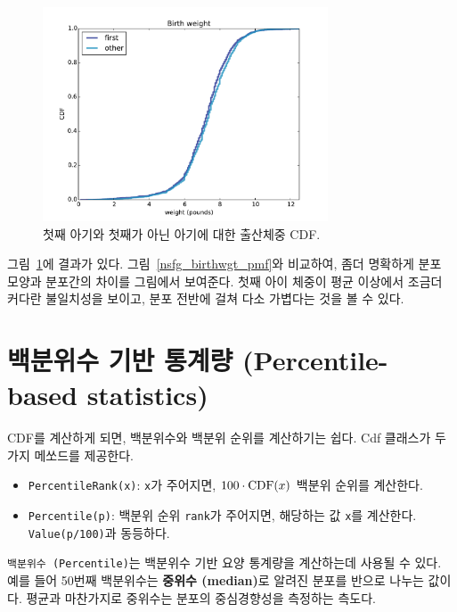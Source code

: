 \begin{figure}
\centerline{\includegraphics[height=2.5in]{figs/cumulative_birthwgt_cdf.pdf}}
\caption{첫째 아기와 첫째가 아닌 아기에 대한 출산체중 CDF.}
\label{cumulative_birthwgt_cdf}
\end{figure}

그림~\ref{cumulative_birthwgt_cdf}에 결과가 있다.
그림~\ref{nsfg_birthwgt_pmf}와 비교하여, 좀더 명확하게 분포 모양과 분포간의 차이를 그림에서 보여준다.
첫째 아이 체중이 평균 이상에서 조금더 커다란 불일치성을 보이고, 분포 전반에 걸쳐 다소 가볍다는 것을 볼 수 있다.


\section{백분위수 기반 통계량 (Percentile-based statistics)}

CDF를 계산하게 되면, 백분위수와 백분위 순위를 계산하기는 쉽다.
Cdf 클래스가 두가지 메쏘드를 제공한다.

\begin{itemize}

\item {\tt PercentileRank(x)}: {\tt x}가 주어지면, $100 \cdot \mathrm{CDF}(x)$ 백분위 순위를 계산한다.

\item {\tt Percentile(p)}: 백분위 순위 {\tt rank}가 주어지면,
해당하는 값 {\tt x}를 계산한다. {\tt Value(p/100)}과 동등하다.

\end{itemize}

{\tt 백분위수 (Percentile)}는 백분위수 기반 요양 통계량을 계산하는데 사용될 수 있다. 예를 들어 50번째 백분위수는 {\bf 중위수 (median)}로 알려진 분포를 반으로 나누는 값이다. 평균과 마찬가지로 중위수는 분포의 중심경향성을 측정하는 측도다.

